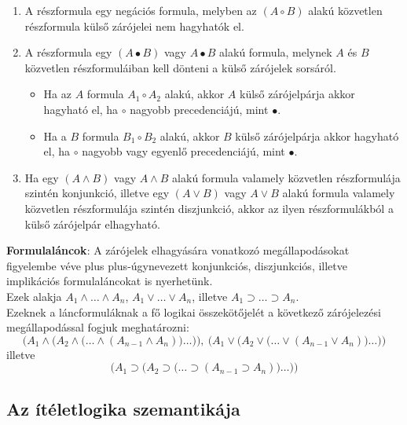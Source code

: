 \documentclass[tikz,12pt,margin=0px]{article}
\newcommand\lword[1]{\leavevmode\nobreak\hskip0pt plus\linewidth\penalty50\hskip0pt plus-\linewidth\nobreak #1}
\begin{document}
	\begin{enumerate}
		\item	A részformula egy negációs formula, melyben az $(A \circ B)$ alakú közvetlen részformula külső zárójelei nem hagyhatók el.
		
		\item	A részformula egy $(A \bullet B)$ vagy $A \bullet B$ alakú formula, melynek $A$ és $B$ közvetlen részformuláiban kell dönteni a külső zárójelek sorsáról.
        \begin{itemize}
            \item Ha az $A$ formula $A_{1} \circ A_{2}$ alakú, akkor $A$ külső zárójelpárja akkor hagyható el, ha $\circ$ nagyobb precedenciájú, mint $\bullet$.
            \item Ha a $B$ formula $B_{1} \circ B_{2}$ alakú, akkor $B$ külső zárójelpárja akkor hagyható el, ha $\circ$ nagyobb vagy egyenlő precedenciájú, mint $\bullet$.
        \end{itemize}
		
		\item	Ha egy $(A \wedge B)$ vagy $A \wedge B$ alakú formula valamely közvetlen részformulája szintén konjunkció, illetve egy
		$(A \vee B)$ vagy $A \vee B$ alakú formula valamely közvetlen részformulája szintén diszjunkció, akkor az ilyen részformulákból a külső zárójelpár elhagyható.
	\end{enumerate}
	
    \noindent \textbf{Formulaláncok}: A zárójelek elhagyására vonatkozó megállapodásokat figyelembe véve \lword{úgynevezett} konjunkciós, diszjunkciós, illetve implikációs formulaláncokat is nyerhetünk.\\

    \noindent Ezek alakja $A_{1} \wedge \ldots \wedge A_{n}$, $A_{1} \vee \ldots \vee A_{n}$, illetve
	$A_{1} \supset \ldots \supset A_{n}$.\\

     \noindent Ezeknek a láncformuláknak a fő logikai összekötőjelét a következő zárójelezési megállapodással fogjuk meghatározni:
     \[
        \Big(A_{1} \wedge \big(A_{2} \wedge \big( \ldots \wedge (A_{n-1} \wedge A_{n})\big)\ldots\big)\Big),\ \Big(A_{1} \vee \big(A_{2} \vee \big( \ldots \vee (A_{n-1} \vee A_{n})\big)\ldots\big)\Big)
     \]
     illetve
     \[
         \Big(A_{1} \supset \big(A_{2} \supset \big( \ldots \supset (A_{n-1} \supset A_{n})\big)\ldots\big)\Big)
     \]

\newpage	
	\subsection*{Az ítéletlogika szemantikája\\}
	
\end{document}
